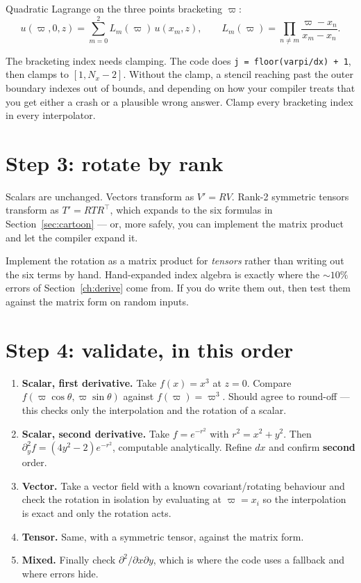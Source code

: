 \documentclass[11pt,openany]{book}
\begin{document}
Quadratic Lagrange on the three points bracketing $\varpi$:
\begin{equation}
u(\varpi,0,z) = \sum_{m=0}^{2} L_m(\varpi)\, u(x_m, z), \qquad
L_m(\varpi) = \prod_{n\neq m}\frac{\varpi - x_n}{x_m - x_n}.
\end{equation}

\gotcha
The bracketing index needs clamping. The code does
\texttt{j = floor(varpi/dx) + 1}, then clamps to $[1, N_x-2]$. Without the
clamp, a stencil reaching past the outer boundary indexes out of bounds, and
depending on how your compiler treats that you get either a crash or a
plausible wrong answer. Clamp every bracketing index in every interpolator.

\section{Step 3: rotate by rank}

Scalars are unchanged. Vectors transform as $V' = R V$. Rank-2 symmetric
tensors transform as $T' = R T R^\top$, which expands to the six formulas in
Section~\ref{sec:cartoon} --- or, more safely, you can implement the matrix
product and let the compiler expand it.

\gotcha
Implement the rotation as a matrix product for \emph{tensors} rather than
writing out the six terms by hand. Hand-expanded index algebra is exactly
where the $\sim 10\%$ errors of Section~\ref{ch:derive} come from. If you do
write them out, then test them against the matrix form on random inputs.

\section{Step 4: validate, in this order}

\begin{enumerate}
\item \textbf{Scalar, first derivative.} Take $f(x) = x^3$ at $z=0$.
      Compare $f(\varpi\cos\theta, \varpi\sin\theta)$ against
      $f(\varpi) = \varpi^3$. Should agree to round-off --- this checks only
      the interpolation and the rotation of a scalar.
\item \textbf{Scalar, second derivative.} Take $f = e^{-r^2}$ with
      $r^2 = x^2+y^2$. Then $\partial_y^2 f = (4y^2-2)e^{-r^2}$, computable
      analytically. Refine $dx$ and confirm \textbf{second} order.
\item \textbf{Vector.} Take a vector field with a known covariant/rotating
      behaviour and check the rotation in isolation by evaluating at
      $\varpi = x_i$ so the interpolation is exact and only the rotation acts.
\item \textbf{Tensor.} Same, with a symmetric tensor, against the matrix form.
\item \textbf{Mixed.} Finally check $\partial^2/\partial x\partial y$, which
      is where the code uses a fallback and where errors hide.
\end{enumerate}
\end{document}
